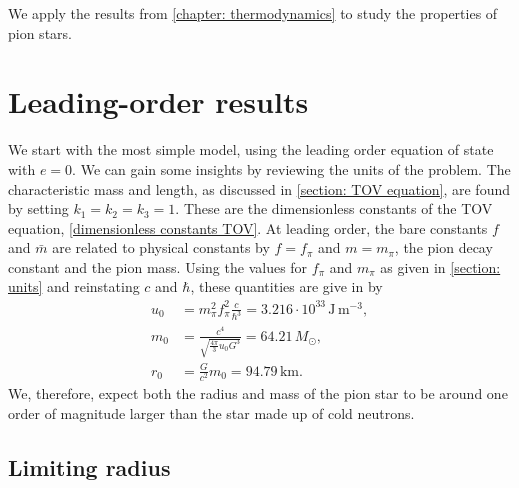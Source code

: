 We apply the results from \autoref{chapter: thermodynamics} to study the properties of pion stars.

\section{Leading-order results}

We start with the most simple model, using the leading order equation of state with $e = 0$.
We can gain some insights by reviewing the units of the problem.
The characteristic mass and length, as discussed in \autoref{section: TOV equation}, are found by setting $k_1 = k_2 = k_3 = 1$.
These are the dimensionless constants of the TOV equation, \autoref{dimensionless constants TOV}.
At leading order, the bare constants $f$ and $\bar m$ are related to physical constants by $f = f_\pi$ and $m = m_\pi$, the pion decay constant and the pion mass.
Using the values for $f_\pi$ and $m_\pi$ as given in \autoref{section: units} and reinstating $c$ and $\hbar$, these quantities are give in by
%
\begin{align}
    u_0 & =m_\pi^2 f_\pi^2 \frac{c}{\hbar^3}
    = 3.216\cdot 10^{33} \, \text{J}\,\text{m}^{-3}, \\
    m_0 & = \frac{c^4}{\sqrt{\frac{4 \pi}{ 3} u_0 G^3}} = 64.21\, M_\odot, \\
    r_0 & = \frac{G}{c^2} m_0 = 94.79 \, \text{km}.
\end{align}
%
We, therefore, expect both the radius and mass of the pion star to be around one order of magnitude larger than the star made up of cold neutrons.

\subsection{Limiting radius}

